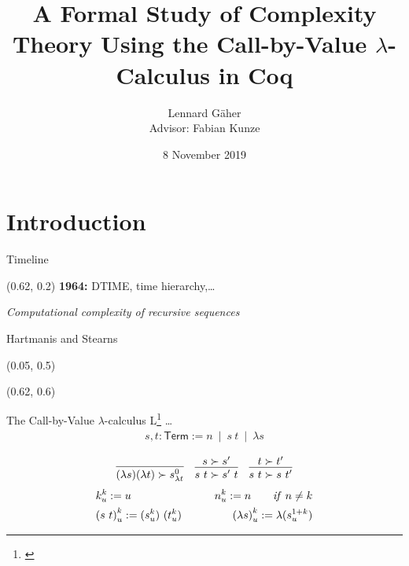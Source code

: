 \documentclass[11pt,usenames,dvipsnames,
  hyperref={pdfencoding=auto,psdextra}]{beamer}
\title{A Formal Study of Complexity Theory Using the Call-by-Value $\lambda$-Calculus in Coq}
\institute{Saarland University}
\date{8 November 2019}
\author{Lennard Gäher\\[1mm] {\small{Advisor: Fabian Kunze}}}
\let\otp\titlepage
\renewcommand{\titlepage}{\otp\addtocounter{framenumber}{-1}}
\newcommand{\bnfmid}{~\mid~}
\begin{document}
\begin{frame}[plain]
  \titlepage
\end{frame}

\section{Introduction}
\begin{frame}{Timeline}

  \setlength{\TPHorizModule}{\textwidth}
  \setlength{\TPVertModule}{\textwidth}
  \begin{textblock}{0.5} (0.62, 0.2)
    \small
    \textbf{1964:} DTIME, time hierarchy,\ldots

    \emph{Computational complexity of recursive sequences}

    Hartmanis and Stearns
  \end{textblock}

    \begin{textblock}{0.5} (0.05, 0.5)
    \end{textblock}

    \begin{textblock}{0.5} (0.62, 0.6)
    \end{textblock}
\end{frame}

\newcommand{\Term}{\textsf{Term}}

\begin{frame}{The Call-by-Value $\lambda$-calculus L\footnote{\cite{ForsterSmolka:2017:L-Computability}} \ldots}
  \begin{align*}
    s, t : \Term := n \bnfmid s~t \bnfmid \lambda s
  \end{align*}

  \begin{align*}
    \infer{(\lambda s)(\lambda t) \succ s^0_{\lambda t}}{}
    && 
    \infer{s~t \succ s'~t}{s \succ s'}
    && 
    \infer{s~t \succ s~t'}{t \succ t'}
  \end{align*}
  \begin{alignat*}{2}
    &k^k_u := u \qquad& n^k_u := n \qquad \mathit{if}~n\neq k \\
    & {(s~t)}^k_u := (s^k_u)~(t^k_u) 
    \qquad & {(\lambda s)}^k_u := \lambda(s^{\natS k}_u)
  \end{alignat*}
\end{frame}
\end{document}
